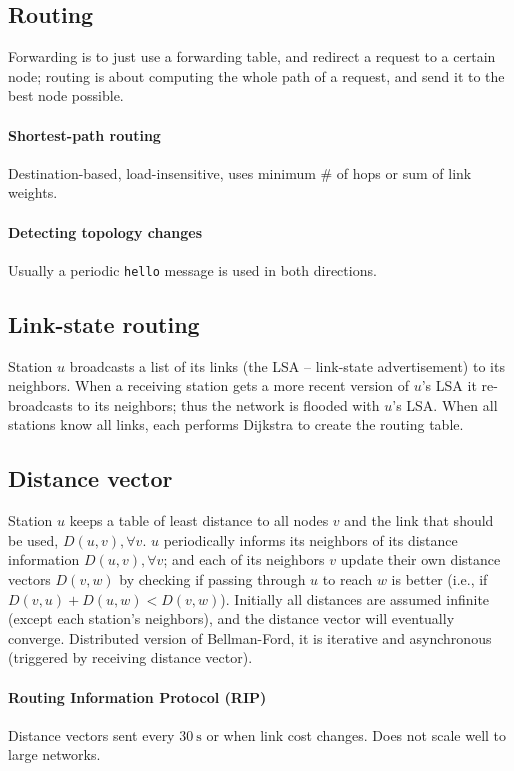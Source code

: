 \documentclass{form}
\begin{document}
\begin{multicols}{3}

    \section*{Routing}
    Forwarding is to just use a forwarding table, and redirect a request to a certain node;
    routing is about computing the whole path of a request, and send it to the best node possible.

    \paragraph{Shortest-path routing}
    Destination-based, load-insensitive, uses minimum \# of hops or sum of link weights.

    \paragraph{Detecting topology changes} Usually a periodic \texttt{hello} message is used in both directions.

    \subsection*{Link-state routing}
    Station $u$ broadcasts a list of its links (the LSA -- link-state advertisement) to its neighbors. When a receiving station gets a more recent version of $u$'s LSA it re-broadcasts to its neighbors; thus the network is flooded with $u$'s LSA. When all stations know all links, each performs Dijkstra to create the routing table.

    \subsection*{Distance vector}
    Station $u$ keeps a table of least distance to all nodes $v$ and the link that should be used, $D(u,v), \forall v$. $u$ periodically informs its neighbors of its distance information $D(u,v), \forall v$; and each of its neighbors $v$ update their own distance vectors $D(v,w)$ by checking if passing through $u$ to reach $w$ is better (i.e., if $D(v,u)+D(u,w) < D(v,w)$). Initially all distances are assumed infinite (except each station's neighbors), and the distance vector will eventually converge. Distributed version of Bellman-Ford, it is iterative and asynchronous (triggered by receiving distance vector).

    \paragraph{Routing Information Protocol (RIP)}
    Distance vectors sent every $\SI{30}{\second}$ or when link cost changes. Does not scale well to large networks.


\end{multicols}
\end{document}

